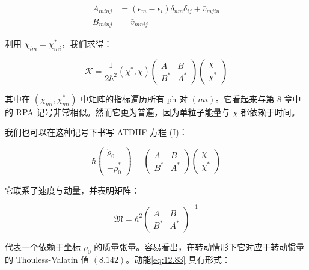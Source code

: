 \begin{align}
A_{minj} & =(\epsilon_{m}-\epsilon_{i})\delta_{nm}\delta_{ij}+\bar{v}_{mjin}\nonumber \\
B_{minj} & =\bar{v}_{mnij}\label{eq:12.82}
\end{align}

利用 $\chi_{im}=\chi^{*}_{mi}$，我们求得：

\begin{equation}
\mathcal{K}=\frac{1}{2\hbar^{2}}(\chi^{*},\chi)\left(\begin{array}{cc}
A & B\\
B^{*} & A^{*}
\end{array}\right)\left(\begin{array}{c}
\chi\\
\chi^{*}
\end{array}\right)\label{eq:12.83}
\end{equation}

其中在 $(\chi_{mi},\chi^{*}_{mi})$ 中矩阵的指标遍历所有 ph 对 $(mi)$。它看起来与第 8
章中的 RPA 记号非常相似。然而它更为普遍，因为单粒子能量与 $\chi$ 都依赖于时间。

我们也可以在这种记号下书写 ATDHF 方程 (I)：

\begin{equation}
\hbar\left(\begin{array}{c}
\dot{\rho}_{0}\\
-\dot{\rho}^{*}_{0}
\end{array}\right)=\left(\begin{array}{cc}
A & B\\
B^{*} & A^{*}
\end{array}\right)\left(\begin{array}{c}
\chi\\
\chi^{*}
\end{array}\right)\label{eq:12.84}
\end{equation}

它联系了速度与动量，并表明矩阵：

\begin{equation}
\mathfrak{M}=\hbar^{2}\left(\begin{array}{cc}
A & B\\
B^{*} & A^{*}
\end{array}\right)^{-1}\label{eq:12.85}
\end{equation}

代表一个依赖于坐标 $\rho_{0}$ 的质量张量。容易看出，在转动情形下它对应于转动惯量的 Thouless-Valatin
值 $(8.142)$。动能\ref{eq:12.83} 具有形式：

